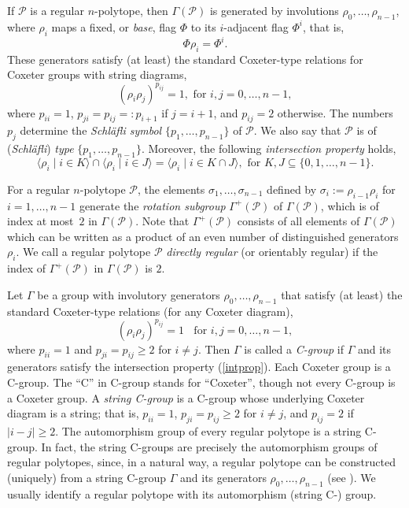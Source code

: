 \documentclass[12pt]{article}
\renewcommand{\>}{\rangle}
\renewcommand{\geq}{\geqslant}
\theoremstyle{definition}\newtheorem{definition}{Definition}[section]
\begin{document}
If $\mathcal{P}$ is a regular $n$-polytope, then $\Gamma(\mathcal{P})$ is generated by involutions $\rho_0,\ldots,\rho_{n-1}$, where $\rho_i$ maps a fixed, or \emph{base\/}, flag $\Phi$ to its $i$-adjacent flag $\Phi^i$, that is,
\[ \Phi\rho_i = \Phi^i.\]
These generators satisfy (at least) the standard Coxeter-type relations for Coxeter groups with string diagrams, 
\begin{equation}
\label{standardrel}
(\rho_i \rho_j)^{p_{ij}} = 1, \textrm{ for } i,j=0, \ldots,n-1,
\end{equation}
where $p_{ii}=1$, $p_{ji} = p_{ij} =: p_{i+1}$ if $j=i+1$, and $p_{ij}=2$ otherwise. The numbers $p_j$ determine the \emph{Schl\"afli symbol} $\{p_{1},\ldots,p_{n-1}\}$ of $\mathcal{P}$. We also say that $\mathcal{P}$ is of (\emph{Schl\"afli}) \emph{type} $\{p_{1},\ldots,p_{n-1}\}$. Moreover, the following {\em intersection property\/} holds,
\begin{equation}
\label{intprop}
\langle \rho_i \mid i \in K \rangle \cap \langle \rho_i \mid i \in J \rangle
= \langle \rho_i \mid i \in {K \cap J} \rangle,
\textrm{ for } K,J \subseteq \{0,1,\ldots,n-1\}.
\end{equation}

For a regular $n$-polytope $\mathcal{P}$, the elements $\sigma_{1},\ldots,\sigma_{n-1}$ defined by $\sigma_{i}:=\rho_{i-1}\rho_{i}$ for $i=1,\ldots,n-1$ generate the {\em rotation subgroup\/} $\Gamma^{+}(\mathcal{P})$ of $\Gamma(\mathcal{P})$, which is of index at most~$2$ in $\Gamma(\mathcal{P})$. Note that $\Gamma^{+}(\mathcal{P})$ consists of all elements of $\Gamma(\mathcal{P})$ which can be written as a product of an even number of distinguished generators $\rho_i$. We call a regular polytope $\mathcal{P}$ {\em directly regular\/} (or orientably regular) if the index of $\Gamma^{+}(\mathcal{P})$ in $\Gamma(\mathcal{P})$ is $2$.

Let $\Gamma$ be a group with involutory generators $\rho_{0},\ldots,\rho_{n-1}$ that satisfy (at least) the standard Coxeter-type relations (for any Coxeter diagram), 
\begin{equation}
\label{standardrel2}
(\rho_i \rho_j)^{p_{ij}} = 1 \;\; \textrm{ for } i,j=0, \ldots,n-1,
\end{equation}
where $p_{ii}=1$ and $p_{ji} = p_{ij}\geq 2$ for $i\neq j$. Then $\Gamma$ is called a {\it C-group\/} if $\Gamma$ and its generators satisfy the intersection property (\ref{intprop}). Each Coxeter group is a C-group. The ``C'' in C-group stands for ``Coxeter'', though not every C-group is a Coxeter group.  A {\it string C-group\/} is a C-group whose underlying Coxeter diagram is a string; that is, $p_{ii}=1$, $p_{ji} = p_{ij}\geq 2$ for $i\neq j$, and $p_{ij}=2$ if $|i-j|\geq 2$. The automorphism group of every regular polytope is a string C-group. In fact, the string C-groups are precisely the automorphism groups of regular polytopes, since, in a natural way, a regular polytope can be constructed (uniquely) from a string C-group $\Gamma$ and its generators $\rho_{0},\ldots,\rho_{n-1}$ (see \cite[Ch. 2E]{MS2002}). We usually identify a regular polytope with its automorphism (string C-) group.
\end{document}
